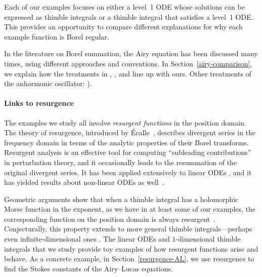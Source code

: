 \documentclass{article}
\theoremstyle{definition}
\theoremstyle{plain}
\newenvironment{todo}{\color{Coral}}{\color{black}}
\newenvironment{revised}{\color{DarkBlue}}{\color{black}}
\newenvironment{revised}{}{}
\begin{document}
Each of our examples focuses on either a level~1 ODE whose solutions can be expressed as thimble integrals or a thimble integral that satisfies a level~1 ODE. This provides an opportunity to compare different explanations for why each example function is Borel regular.

In the literature on Borel summation, the Airy equation has been discussed many times, using different approaches and conventions. In Section~\ref{airy-comparison}, we explain how the treatments in \cite[Section 2.2]{lectures-Marino}, \cite[Section 6.14]{diverg-resurg-i}, and \cite[Section 2.2]{kawai-takei} line up with ours.
 \begin{todo}Other treatments of the anharmonic oscillator: \cite{bender-wu}\cite[Appendix B]{aniceto2019primer}\cite[Section 2.5.3]{sternin1995borel}).\end{todo}
%
\paragraph{Links to resurgence}
%
The examples we study all involve {\em resurgent functions} in the position domain. \begin{revised}The theory of resurgence, introduced by \'Ecalle~\cite{EcalleI,EcalleII,EcalleIII}, describes divergent series in the frequency domain in terms of the analytic properties of their Borel transforms. Resurgent analysis is an effective tool for computing ``subleading contributions'' in perturbation theory, and it occasionally leads to the resummation of the original divergent series. It\end{revised} has been applied extensively to linear ODEs \cite{loday1994stokes,diverg-resurg--ii}, and it has yielded results about non-linear ODEs as well~\cite{costin-PI,costin_kruskal,diverg-resurg-iii,schiappa-PI}.

Geometric arguments show that when a thimble integral has a holomorphic Morse function in the exponent, as we have in at least some of our examples, the corresponding function on the position domain is always resurgent~\cite{Maxim_slide_ERC}\cite[Section 6.2]{kontsevich2022analyticity}. Conjecturally, this property extends to more general thimble integrals---perhaps even infinite-dimensional ones \cite[examples~5--6]{Maxim_slide_ERC}. The linear ODEs and $1$-dimensional thimble integrals that we study provide toy examples of how resurgent functions arise and behave. As a concrete example, in Section~\ref{resurgence-AL}, we use resurgence to find the Stokes constants of the Airy--Lucas equations.
%
\end{document}
